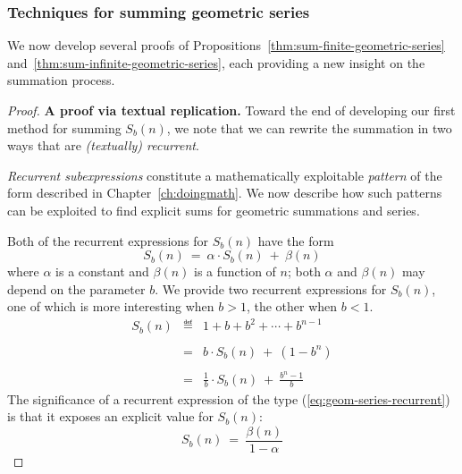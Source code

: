 \subsubsection{Techniques for summing geometric series}
\label{sec:summing-geometric-series:techniques}

We now develop several proofs of Propositions~\ref{thm:sum-finite-geometric-series} and~\ref{thm:sum-infinite-geometric-series}, each providing a new insight on the summation process.

\medskip

\begin{proof}
{\bf A proof via textual replication.}
Toward the end of developing our first method for summing $S_{b}(n)$, we note that we can rewrite the summation in two ways that are {\em (textually) recurrent}.

\bigskip

\noindent
{\em Recurrent subexpressions} constitute a mathematically exploitable {\em pattern} of the form described in Chapter~\ref{ch:doingmath}.  We now describe how such patterns can be exploited to find explicit sums for geometric summations and series.

\bigskip

\noindent
Both of the recurrent expressions for $S_{b}(n)$ have the form
\begin{equation}
\label{eq:geom-series-recurrent}
S_b(n) \ = \ \alpha \cdot S_b(n) \ + \ \beta(n)
\end{equation}
where $\alpha$ is a constant and $\beta(n)$ is a function of $n$; both $\alpha$ and $\beta(n)$ may depend on the parameter $b$.  We provide two recurrent expressions for $S_b(n)$, one of which is more interesting when $b>1$, the other when $b<1$.
\begin{eqnarray}
\label{eq:geom-series-replicate}
\nonumber
S_{b}(n) 
  & \eqdef &
1+ b + b^2 + \cdots + b^{n-1}  \\
\nonumber
  &   &  \\
\label{eq:geom-series-replicate-1}
   & = & b \cdot S_{b}(n) \ + \ (1 - b^n) \\
\nonumber
   &  & \\
\label{eq:geom-series-replicate-2}
  & = &
\frac{1}{b} \cdot S_{b}(n) \ + \ \frac{b^n -1}{b} 
\end{eqnarray}
The significance of a recurrent expression of the type (\ref{eq:geom-series-recurrent}) is that it exposes an explicit value for $S_b(n)$:
\begin{equation}
\label{eq:geom-series-generic}
S_b(n) \ = \ \frac{\beta(n)}{1 - \alpha}
\end{equation}


\end{proof}
